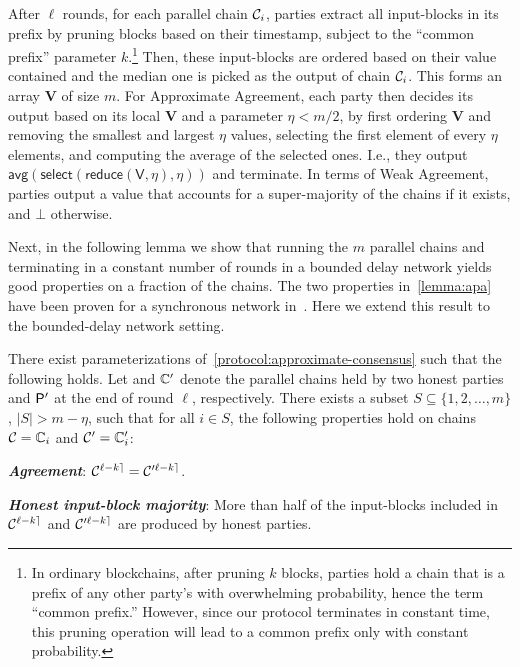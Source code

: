 After $\ell$ rounds, for each parallel chain $\mathcal{C}_i$, parties extract all input-blocks in its prefix by pruning blocks based on their timestamp, subject to the ``common prefix'' parameter $k$.\footnote{In ordinary blockchains, after pruning $k$ blocks, parties hold a chain that is a prefix of any other party's with overwhelming probability, hence the term ``common prefix.'' However, since our protocol terminates in constant time, this pruning operation will lead to a common prefix only with constant probability.}
%
Then, these input-blocks are ordered based on their value contained and the median one is picked as the output of chain $\mathcal{C}_i$.
%
This forms an array $\mathbf{V}$ of size $m$.
%
For Approximate Agreement, each party then decides its output based on its local $\mathbf{V}$ and a parameter $\eta < m / 2$, by first ordering $\mathbf{V}$ and removing the smallest and largest $\eta$ values, selecting the first element of every $\eta$ elements, and computing the average of the selected ones.
%
I.e., they output $\textsf{avg}(\mathsf{select}(\mathsf{reduce}(\mathsf{V}, \eta), \eta))$ and terminate.
%
In terms of Weak Agreement, parties output a value that accounts for a super-majority of the chains if it exists, and $\mathcal{\bot}$ otherwise.



Next, in the following lemma we show that running the $m$ parallel chains and terminating in a constant number of rounds in a bounded delay network yields good properties on a fraction of the chains.
%
The two properties in~\cref{lemma:apa} have been proven for a synchronous network in~\cite{EC:GarKiaShe24}.
%
Here we extend this result to the bounded-delay network setting.

\begin{lemma} \label{lemma:apa}
    There exist parameterizations of~\cref{protocol:approximate-consensus} such that the following holds.
    Let \parallelChains and $\mathbb{C}'$ denote the parallel chains held by two honest parties \party and $\mathsf{P}'$ at the end of round $\ell$, respectively.
    There exists a subset $S \subseteq \{1, 2, \ldots, m \}$, $|S| > m - \eta$, such that for all $i \in S$, the following properties hold on chains $\mathcal{C} = \mathbb{C}_i$ and $\mathcal{C}' = \mathbb{C}'_i$:
    \begin{cccItemize}[nosep]
        \item \emph{\bf Agreement}: $\mathcal{C}^{{\ell - k}\rceil} = \mathcal{C}'^{{\ell - k}\rceil}$.

        \item \emph{\bf Honest input-block majority}: More than half of the input-blocks included in $\mathcal{C}^{{\ell - k}\rceil}$ and $\mathcal{C}'^{{\ell - k}\rceil}$ are produced by honest parties.
    \end{cccItemize}
\end{lemma}

